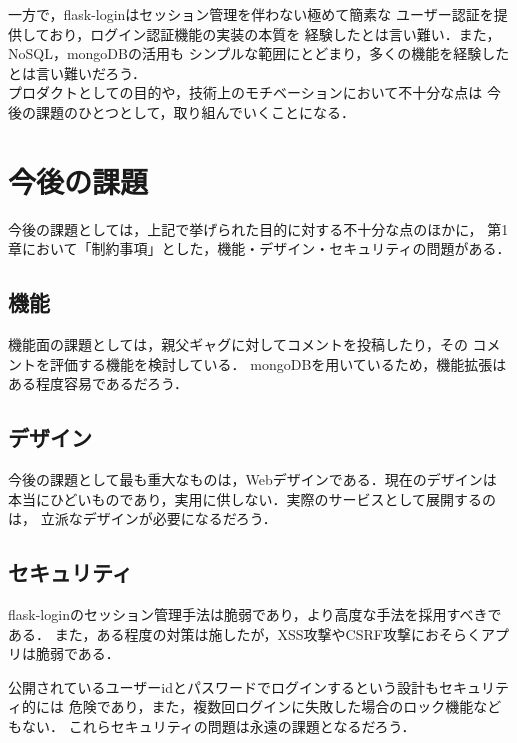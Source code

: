 \documentclass[a4paper,11pt]{jsreport}
\begin{document}
一方で，flask-loginはセッション管理を伴わない極めて簡素な
ユーザー認証を提供しており，ログイン認証機能の実装の本質を
経験したとは言い難い．また，NoSQL，mongoDBの活用も
シンプルな範囲にとどまり，多くの機能を経験したとは言い難いだろう．
\\

プロダクトとしての目的や，技術上のモチベーションにおいて不十分な点は
今後の課題のひとつとして，取り組んでいくことになる．
\section{今後の課題}
今後の課題としては，上記で挙げられた目的に対する不十分な点のほかに，
第1章において「制約事項」とした，機能・デザイン・セキュリティの問題がある．
\subsection{機能}
機能面の課題としては，親父ギャグに対してコメントを投稿したり，その
コメントを評価する機能を検討している．
mongoDBを用いているため，機能拡張はある程度容易であるだろう．
\subsection{デザイン}
今後の課題として最も重大なものは，Webデザインである．現在のデザインは
本当にひどいものであり，実用に供しない．実際のサービスとして展開するのは，
立派なデザインが必要になるだろう．
\subsection{セキュリティ}
flask-loginのセッション管理手法は脆弱であり，より高度な手法を採用すべきである．
また，ある程度の対策は施したが，XSS攻撃やCSRF攻撃におそらくアプリは脆弱である．

公開されているユーザーidとパスワードでログインするという設計もセキュリティ的には
危険であり，また，複数回ログインに失敗した場合のロック機能などもない．
これらセキュリティの問題は永遠の課題となるだろう．

\renewcommand{\bibname}{参考文献}


\end{document}
